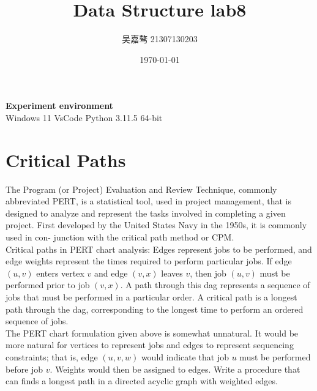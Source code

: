 \documentclass[UTF8]{ctexart}
\title{\textbf{Data Structure lab8}}
\author{吴嘉骜 21307130203}
\date{\today}
\begin{document}
\maketitle

\noindent
\textbf {\large Experiment environment} \\
   Windows 11 VsCode Python 3.11.5 64-bit\\

\setlength{\parindent}{0pt}
\section*{Critical Paths}
The Program (or Project) Evaluation and Review Technique, commonly abbreviated PERT, 
is a statistical tool, used in project management, that is designed
to analyze and represent the tasks involved in completing a given project. First
developed by the United States Navy in the 1950s, it is commonly used in con-
junction with the critical path method or CPM.\\
Critical paths in PERT chart analysis: Edges represent jobs to be performed,
and edge weights represent the times required to perform particular jobs. If
edge $(u, v)$ enters vertex $v$ and edge $(v, x)$ leaves $v$, then job $(u, v)$ must be
performed prior to job $(v, x)$. A path through this dag represents a sequence of
jobs that must be performed in a particular order. A critical path is a longest
path through the dag, corresponding to the longest time to perform an ordered
sequence of jobs.\\
The PERT chart formulation given above is somewhat unnatural. It would be
more natural for vertices to represent jobs and edges to represent sequencing
constraints; that is, edge $(u, v, w)$ would indicate that job $u$ must be performed
before job $v$. Weights would then be assigned to edges. Write a
procedure that can finds a longest path in a directed acyclic graph with weighted edges.
\end{document}
